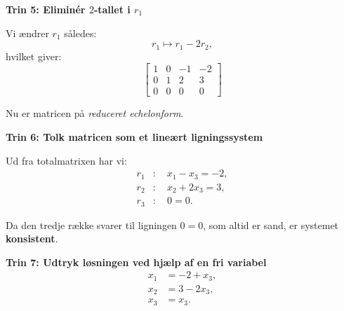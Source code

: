 \begin{solution}
    \textbf{Trin 5: Eliminér \( 2 \)-tallet i \( r_1 \)}
        
        Vi ændrer \( r_1 \) således:
        \[
        r_1 \mapsto r_1 - 2r_2,
        \]
        hvilket giver:
        \[
        \left[\begin{array}{ccc|c}
        1 & 0 & -1 & -2 \\
        0 & 1 & 2 & 3 \\
        0 & 0 & 0 & 0
        \end{array}\right]
        \]
        
    Nu er matricen på \textit{reduceret echelonform}.
        
    \textbf{Trin 6: Tolk matricen som et lineært ligningssystem}
        
        Ud fra totalmatrixen har vi:
        \[
        \begin{aligned}
        r_1 &: \quad x_1 - x_3 = -2, \\
        r_2 &: \quad x_2 + 2x_3 = 3, \\
        r_3 &: \quad 0 = 0.
        \end{aligned}
        \]
        
    Da den tredje række svarer til ligningen \( 0 = 0 \), som altid er sand, er systemet \textbf{konsistent}.
        
    \textbf{Trin 7: Udtryk løsningen ved hjælp af en fri variabel}
        \[
        \begin{aligned}
        x_1 &= -2 + x_3, \\
        x_2 &= 3 - 2x_3, \\
        x_3 &= x_3.
        \end{aligned}
        \]      
\end{solution}
